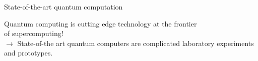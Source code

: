 \documentclass[10pt]{beamer}
\begin{document}
{
\begin{frame}[fragile]{State-of-the-art quantum computation}

Quantum computing is cutting edge technology at the frontier\\ of supercomputing!\\
\vspace{0.5cm}
$\rightarrow$ State-of-the art quantum computers are complicated laboratory experiments and prototypes.


\end{frame}
}
\end{document}
